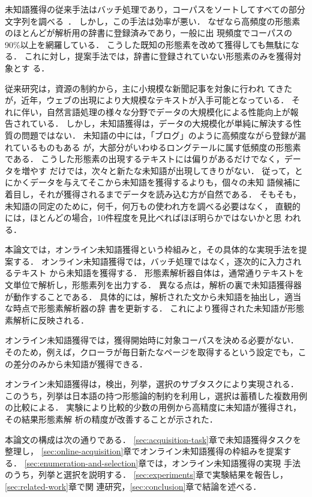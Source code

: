 \documentclass[japanese]{jnlp_1.4}
\begin{document}
未知語獲得の従来手法はバッチ処理であり，コーパスをソートしてすべての部分
文字列を調べる~\cite{Mori1996full}．
しかし，この手法は効率が悪い．
なぜなら高頻度の形態素のほとんどが解析用の辞書に登録済みであり，一般に出
現頻度でコーパスの90\%以上を網羅している．
こうした既知の形態素を改めて獲得しても無駄になる．
これに対し，提案手法では，辞書に登録されていない形態素のみを獲得対象とす
る．

従来研究は，資源の制約から，主に小規模な新聞記事を対象に行われ
てきたが，近年，ウェブの出現により大規模なテキストが入手可能となっている．
それに伴い，自然言語処理の様々な分野でデータの大規模化による性能向上が報
告されている\cite{Banko2001full,Brants2007full}．
しかし，未知語獲得は，データの大規模化が単純に解決する性質の問題ではない．
未知語の中には，「ブログ」のように高頻度ながら登録が漏れているものもある
が，大部分がいわゆるロングテールに属す低頻度の形態素である．
こうした形態素の出現するテキストには偏りがあるだけでなく，データを増やす
だけでは，次々と新たな未知語が出現してきりがない．
従って，とにかくデータを与えてそこから未知語を獲得するよりも，個々の未知
語候補に着目し，それが獲得されるまでデータを読み込む方が自然である．
そもそも，未知語の同定のために，何千，何万もの使われ方を調べる必要はなく，
直観的には，ほとんどの場合，10件程度を見比べればほぼ明らかではないかと思
われる．

本論文では，オンライン未知語獲得という枠組みと，その具体的な実現手法を提
案する．
オンライン未知語獲得では，バッチ処理ではなく，逐次的に入力されるテキスト
から未知語を獲得する．
形態素解析器自体は，通常通りテキストを文単位で解析し，形態素列を出力する．
異なる点は，解析の裏で未知語獲得器が動作することである．
具体的には，解析された文から未知語を抽出し，適当な時点で形態素解析器の辞
書を更新する．
これにより獲得された未知語が形態素解析に反映される．

オンライン未知語獲得では，獲得開始時に対象コーパスを決める必要がない．
そのため，例えば，クローラが毎日新たなページを取得するという設定でも，こ
の差分のみから未知語が獲得できる．

オンライン未知語獲得は，検出，列挙，選択のサブタスクにより実現される．
このうち，列挙は日本語の持つ形態論的制約を利用し，選択は蓄積した複数用例
の比較による．
実験により比較的少数の用例から高精度に未知語が獲得され，その結果形態素解
析の精度が改善することが示された．

本論文の構成は次の通りである．
\ref{sec:acquisition-task}章で未知語獲得タスクを整理し，
\ref{sec:online-acquisition}章でオンライン未知語獲得の枠組みを提案する．
\ref{sec:enumeration-and-selection}章では，オンライン未知語獲得の実現
手法のうち，列挙と選択を説明する．
\ref{sec:experiments}章で実験結果を報告し，\ref{sec:related-work}章で関
連研究，\ref{sec:conclusion}章で結論を述べる．
\end{document}
